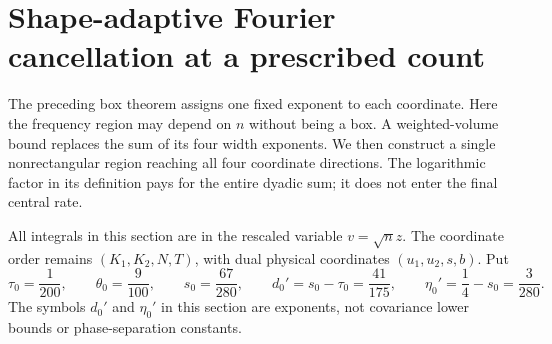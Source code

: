 \section{Shape-adaptive Fourier cancellation at a prescribed count}
\label{sec:shape-adaptive-fixed-count}
The preceding box theorem assigns one fixed exponent to each coordinate.
Here the frequency region may depend on $n$ without being a box. A
weighted-volume bound replaces the sum of its four width exponents.
We then construct a single nonrectangular region reaching all four
coordinate directions. The logarithmic factor in its definition pays
for the entire dyadic sum; it does not enter the final central rate.

All integrals in this section are in the rescaled variable $v=\sqrt n z$.
The coordinate order remains $(K_1,K_2,N,T)$, with dual physical
coordinates $(u_1,u_2,s,b)$. Put
\begin{equation}\label{eq:shape-fixed-constants}
 \tau_0=\frac1{200},\qquad \theta_0=\frac9{100},\qquad
 s_0=\frac{67}{280},\qquad d_0'=s_0-\tau_0=\frac{41}{175},\qquad
 \eta_0'=\frac14-s_0=\frac3{280}.
\end{equation}
The symbols $d_0'$ and $\eta_0'$ in this section are exponents, not
covariance lower bounds or phase-separation constants.

